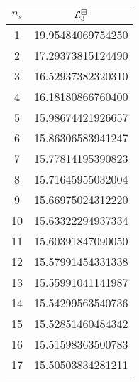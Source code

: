 \begin{tabular}[t]{S[table-format=1.0]S[table-format=-1.15,table-auto-round=false]}
\toprule
  {$n_{s}$} &  {$\mathcal L^{\boxplus}_3$} \\  &                   19.95484069754250 \\
        2 &                   17.29373815124490 \\
        3 &                   16.52937382320310 \\
        4 &                   16.18180866760400 \\
        5 &                   15.98674421926657 \\
        6 &                   15.86306583941247 \\
        7 &                   15.77814195390823 \\
        8 &                   15.71645955032004 \\
        9 &                   15.66975024312220 \\
       10 &                   15.63322294937334 \\
       11 &                   15.60391847090050 \\
       12 &                   15.57991454331338 \\
       13 &                   15.55991041141987 \\
       14 &                   15.54299563540736 \\
       15 &                   15.52851460484342 \\
       16 &                   15.51598363500783 \\
       17 &                   15.50503834281211 \\
\bottomrule
\end{tabular}
\hspace{2em}
